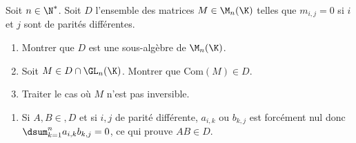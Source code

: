 \begin{enonce}
\begin{exercise}[ID={RMS134 E560},subtitle={Oral
    Mines-Ponts},theme={algebre},annee={2023},concours={mines-ponts},filiere={MP}, difficulty={0}]
  Soit $n\in\N^*$. Soit $D$ l'ensemble des matrices $M\in\M_n(\K)$
  telles que $m_{i,j}=0$ si $i$ et $j$ sont de parités différentes.
  \begin{enumerate}
  \item Montrer que $D$ est une sous-algèbre de $\M_n(\K)$.
  \item Soit $M\in D\cap\GL_n(\K)$. Montrer que $\mathrm{Com}(M)\in
    D$.
  \item Traiter le cas où $M$ n'est pas inversible.
  \end{enumerate}
\end{exercise}
\begin{solution}
  \begin{enumerate}
  \item Si $A,B\in, D$ et si $i,j$ de parité différente, $a_{i,k}$ ou
    $b_{k,j}$ est forcément nul donc $\dsum_{k=1}^na_{i,k}b_{k,j}=0$,
    ce qui prouve $AB\in D$.
  \end{enumerate}
\end{solution}
\end{enonce}